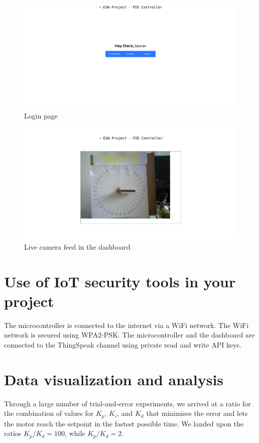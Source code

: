 \documentclass[12pt, a4paper]{article}
\theoremstyle{definition}
\theoremstyle{remark}
\begin{document}
\begin{figure}[!h]
    \centering
    \includegraphics[scale=0.2]{img/loggedin_homepage.png}
    \caption{Login page}
    \label{fig:4}
\end{figure}

\begin{figure}[!h]
    \centering
    \includegraphics[scale=0.2]{img/video_feed.png}
    \caption{Live camera feed in the dashboard}
    \label{fig:6}
\end{figure}

\section{Use of IoT security tools in your project}
The microcontroller is connected to the internet via a WiFi network. The WiFi network is secured using WPA2-PSK. The microcontroller and the dashboard are connected to the ThingSpeak channel using private read and write API keys.

\section{Data visualization and analysis}
Through a large number of trial-and-error experiments, we arrived at a ratio for the combination of values for $K_p$, $K_i$, and $K_d$ that minimises the error and lets the motor reach the setpoint in the fastest possible time. We landed upon the ratios $K_p / K_d = 100$, while $K_p / K_d = 2$.
\end{document}
